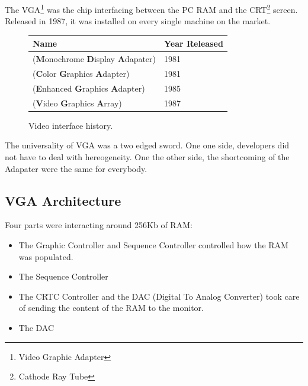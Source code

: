 \documentclass[book.tex]{subfiles}
\begin{document}
The VGA\footnote{Video Graphic Adapter} was the chip interfacing between the PC RAM and the CRT\footnote{Cathode Ray Tube} screen. Released in 1987, it was installed on every single machine on the market. 

\bigskip
  
 \begin{figure}[H]
\centering  
\begin{tabularx}{0.9\textwidth}{ X  Y }
  \toprule
  \textbf{Name} &  \textbf{Year Released} \\
  \toprule {}
   (\textbf{M}onochrome
   \textbf{D}isplay
   \textbf{A}dapater) & 1981 
   \\ 
   (\textbf{C}olor
   \textbf{G}raphics
   \textbf{A}dapter) & 1981 
    \\ 
   (\textbf{E}nhanced
   \textbf{G}raphics
   \textbf{A}dapter) & 1985
   \\ 
   (\textbf{V}ideo
   \textbf{G}raphics
   \textbf{A}rray)  & 1987
    \\
  \toprule
\end{tabularx}
\caption{Video interface history.}\label{fig:vga_history}
\end{figure}

The universality of VGA was a two edged sword. One one side, developers did not have to deal with hereogeneity. One the other side, the shortcoming of the Adapater were the same for everybody.




\subsection{VGA Architecture}

  Four parts were interacting around 256Kb of RAM:

\begin{itemize}
\item The Graphic Controller and Sequence Controller controlled how the RAM was populated.
\item The Sequence Controller
\item The CRTC Controller and the DAC (Digital To Analog Converter) took care of sending the content of the RAM to the monitor.
\item The DAC
\end{itemize}
\end{document}
